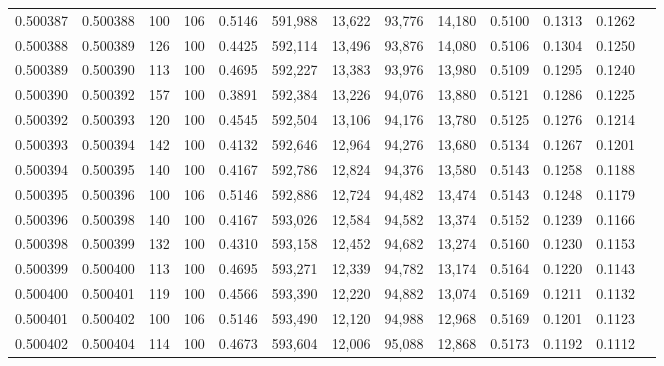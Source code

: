 \begin{tabular}{rrrrrrrrrrrrr}
0.500387 & 0.500388 &   100 & 106 &                                     0.5146 & 591,988 &  13,622 &  93,776 &  14,180 & 0.5100 & 0.1313 & 0.1262 \\
0.500388 & 0.500389 &   126 & 100 &                                     0.4425 & 592,114 &  13,496 &  93,876 &  14,080 & 0.5106 & 0.1304 & 0.1250 \\
0.500389 & 0.500390 &   113 & 100 &                                     0.4695 & 592,227 &  13,383 &  93,976 &  13,980 & 0.5109 & 0.1295 & 0.1240 \\
0.500390 & 0.500392 &   157 & 100 &                                     0.3891 & 592,384 &  13,226 &  94,076 &  13,880 & 0.5121 & 0.1286 & 0.1225 \\
0.500392 & 0.500393 &   120 & 100 &                                     0.4545 & 592,504 &  13,106 &  94,176 &  13,780 & 0.5125 & 0.1276 & 0.1214 \\
0.500393 & 0.500394 &   142 & 100 &                                     0.4132 & 592,646 &  12,964 &  94,276 &  13,680 & 0.5134 & 0.1267 & 0.1201 \\
0.500394 & 0.500395 &   140 & 100 &                                     0.4167 & 592,786 &  12,824 &  94,376 &  13,580 & 0.5143 & 0.1258 & 0.1188 \\
0.500395 & 0.500396 &   100 & 106 &                                     0.5146 & 592,886 &  12,724 &  94,482 &  13,474 & 0.5143 & 0.1248 & 0.1179 \\
0.500396 & 0.500398 &   140 & 100 &                                     0.4167 & 593,026 &  12,584 &  94,582 &  13,374 & 0.5152 & 0.1239 & 0.1166 \\
0.500398 & 0.500399 &   132 & 100 &                                     0.4310 & 593,158 &  12,452 &  94,682 &  13,274 & 0.5160 & 0.1230 & 0.1153 \\
0.500399 & 0.500400 &   113 & 100 &                                     0.4695 & 593,271 &  12,339 &  94,782 &  13,174 & 0.5164 & 0.1220 & 0.1143 \\
0.500400 & 0.500401 &   119 & 100 &                                     0.4566 & 593,390 &  12,220 &  94,882 &  13,074 & 0.5169 & 0.1211 & 0.1132 \\
0.500401 & 0.500402 &   100 & 106 &                                     0.5146 & 593,490 &  12,120 &  94,988 &  12,968 & 0.5169 & 0.1201 & 0.1123 \\
0.500402 & 0.500404 &   114 & 100 &                                     0.4673 & 593,604 &  12,006 &  95,088 &  12,868 & 0.5173 & 0.1192 & 0.1112 \\

\end{tabular}
